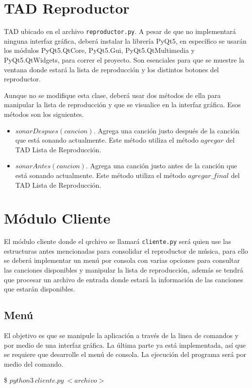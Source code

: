 \documentclass[10pt, letterpaper]{article}
\begin{document}
\section*{TAD Reproductor}
TAD ubicado en el archivo \texttt{reproductor.py}. A pesar de que no implementará ninguna interfaz gráfica, deberá instalar la librería PyQt5, en específico se usarán los módulos PyQt5.QtCore, PyQt5.Gui, PyQt5.QtMultimedia y PyQt5.QtWidgets, para correr el proyecto. Son esenciales para que se muestre la ventana donde estará la lista de reproducción y los distintos botones del reproductor.

Aunque no se modifique esta clase, deberá usar dos métodos de ella para manipular la lista de reproducción y que se visualice en la interfaz gráfica. Esos métodos son los siguientes.

\begin{itemize}
    \item $sonarDespues(cancion)$. Agrega una canción justo después de la canción que está sonando actualmente. Este método utiliza el método $agregar$ del TAD Lista de Reproducción.
    \item $sonarAntes(cancion)$. Agrega una canción justo antes de la canción que está sonando actualmente. Este método utiliza el método $agregar\_final$ del TAD Lista de Reproducción.
\end{itemize}

\section*{Módulo Cliente}
El módulo cliente donde el qrchivo se llamará \texttt{cliente.py} será quien use las estructuras antes mencionadas para consolidar el reproductor de música, para ello se deberá implementar un menú por consola con varias opciones para consultar las canciones disponibles y manipular la lista de reproducción, además se tendrá que procesar un archivo de entrada donde estará la información de las canciones que estarán disponibles.

\subsection*{Menú}
El objetivo es que se manipule la aplicación a través de la linea de comandos y por medio de una interfaz gráfica. La última parte ya está implementada, así que se requiere que desarrolle el menú de consola. La ejecución del programa será por medio del comando.

\begin{center}
\$ $python3\ cliente.py\ <archivo>$
\end{center}
\end{document}

